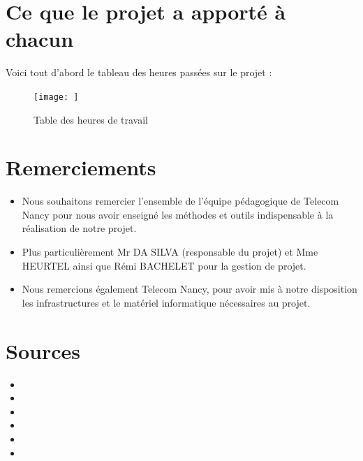 \documentclass{article}
\begin{document}
\color{orange} \section{ Ce que le projet a apporté à chacun}
\color{color2}

Voici tout d'abord le tableau des heures passées sur le projet :

\begin{figure}[H]
    \centering
    \texttt{[image: ]}
    \caption{Table des heures de travail}
    \label{fig:tableheures}
\end{figure}


\color{orange} \section{ Remerciements}
\color{color2}

\begin{itemize}
    \color{color2}
    \item Nous souhaitons remercier l’ensemble de l’équipe pédagogique de Telecom Nancy pour nous avoir enseigné les méthodes et outils indispensable à la réalisation de notre projet.
    \item Plus particulièrement Mr DA SILVA (responsable du projet) et Mme HEURTEL ainsi que Rémi BACHELET pour la gestion de projet.
    \item Nous remercions également Telecom Nancy, pour avoir mis à notre disposition les infrastructures et le matériel informatique nécessaires au projet.
    \end{itemize}

\color{orange} \section{ Sources }
\color{color2}

\begin{itemize}
    \color{color2}
    \item
    \item
    \item
    \item
    \item
    \item
    \end{itemize}
\end{document}
